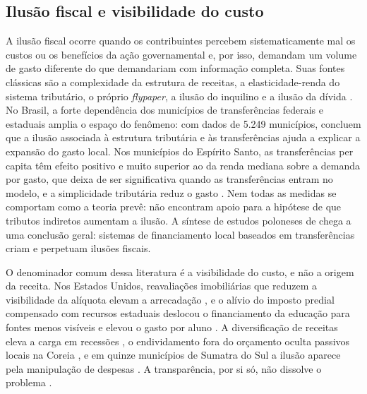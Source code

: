 \subsection{Ilusão fiscal e visibilidade do custo}\label{sec:ilusao}

A ilusão fiscal ocorre quando os contribuintes percebem sistematicamente mal os custos ou os benefícios da ação governamental e, por isso, demandam um volume de gasto diferente do que demandariam com informação completa. Suas fontes clássicas são a complexidade da estrutura de receitas, a elasticidade-renda do sistema tributário, o próprio \textit{flypaper}, a ilusão do inquilino e a ilusão da dívida \citep{DolleryWorthington1996}. No Brasil, a forte dependência dos municípios de transferências federais e estaduais amplia o espaço do fenômeno: com dados de 5.249 municípios, \citet{Araujo2016189} concluem que a ilusão associada à estrutura tributária e às transferências ajuda a explicar a expansão do gasto local. Nos municípios do Espírito Santo, as transferências per capita têm efeito positivo e muito superior ao da renda mediana sobre a demanda por gasto, que deixa de ser significativa quando as transferências entram no modelo, e a simplicidade tributária reduz o gasto \citep{MontePinto2019}. Nem todas as medidas se comportam como a teoria prevê: \citet{Pansani2020} não encontram apoio para a hipótese de que tributos indiretos aumentam a ilusão. A síntese de estudos poloneses de \citet{Guziejewska20217} chega a uma conclusão geral: sistemas de financiamento local baseados em transferências criam e perpetuam ilusões fiscais.

O denominador comum dessa literatura é a visibilidade do custo, e não a origem da receita. Nos Estados Unidos, reavaliações imobiliárias que reduzem a visibilidade da alíquota elevam a arrecadação \citep{Ross2018635, Kim2025673}, e o alívio do imposto predial compensado com recursos estaduais deslocou o financiamento da educação para fontes menos visíveis e elevou o gasto por aluno \citep{Jackson2025}. A diversificação de receitas eleva a carga em recessões \citep{Shi2018416}, o endividamento fora do orçamento oculta passivos locais na Coreia \citep{Jeong2020333}, e em quinze municípios de Sumatra do Sul a ilusão aparece pela manipulação de despesas \citep{Ilmiyyah20201033}. A transparência, por si só, não dissolve o problema \citep{Yang2022}.

